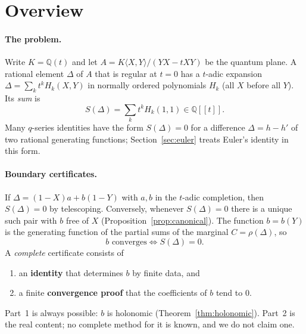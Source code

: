 \documentclass[11pt,a4paper]{article}
\newcommand{\Q}{\mathbb Q}
\theoremstyle{plain}
\theoremstyle{definition}
\theoremstyle{remark}
\begin{document}
\section{Overview}\label{sec:overview}

\paragraph{The problem.} Write $K=\Q(t)$ and let $A=K\langle X,Y\rangle/(YX-tXY)$
be the quantum plane. A rational element $\Delta$ of $A$ that is regular at
$t=0$ has a $t$-adic expansion $\Delta=\sum_k t^kH_k(X,Y)$ in normally ordered
polynomials $H_k$ (all $X$ before all $Y$). Its \emph{sum} is
\[
  S(\Delta)=\sum_k t^kH_k(1,1)\in\Q[[t]].
\]
Many $q$-series identities have the form $S(\Delta)=0$ for a difference
$\Delta=h-h'$ of two rational generating functions;
Section~\ref{sec:euler} treats Euler's identity in this form.

\paragraph{Boundary certificates.} If $\Delta=(1-X)a+b(1-Y)$ with $a,b$ in the
$t$-adic completion, then $S(\Delta)=0$ by telescoping. Conversely, whenever
$S(\Delta)=0$ there is a unique such pair with $b$ free of $X$
(Proposition~\ref{prop:canonical}). The function $b=b(Y)$ is the generating
function of the partial sums of the marginal $C=\rho(\Delta)$, so
\[
  \text{$b$ converges}\iff S(\Delta)=0.
\]
A \emph{complete} certificate consists of
\begin{enumerate}
\item an \textbf{identity} that determines $b$ by finite data, and
\item a finite \textbf{convergence proof} that the coefficients of $b$ tend to $0$.
\end{enumerate}
Part~1 is always possible: $b$ is holonomic (Theorem~\ref{thm:holonomic}). Part~2
is the real content; no complete method for it is known, and we do not claim one.
\end{document}
